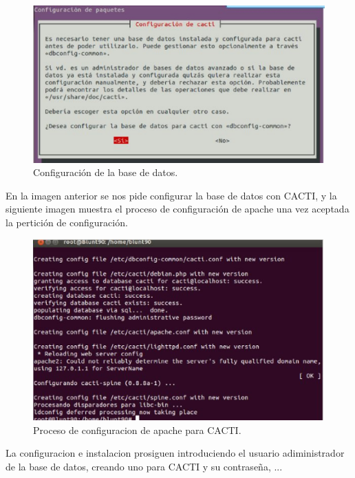 \begin{figure}[H]
\begin{center}
\includegraphics[scale=0.5]{imagenes/opcional5-1.eps}
\caption{Configuración de la base de datos.}
\end{center}
\end{figure}

En la imagen anterior se nos pide configurar la base de datos con CACTI, y la siguiente imagen muestra el proceso de configuración de apache una vez aceptada la pertición de configuración.

\begin{figure}[H]
\begin{center}
\includegraphics[scale=0.5]{imagenes/opcional5-2.eps}
\caption{Proceso de configuracion de apache para CACTI.}
\end{center}
\end{figure}

La configuracion e instalacion prosiguen introduciendo el usuario adiministrador de la base de datos, creando uno para CACTI y su contraseña, ...

